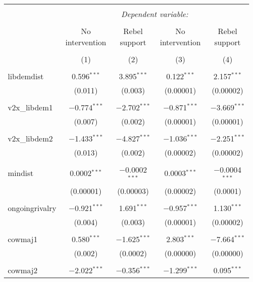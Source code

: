 
\begin{table}[!htbp] \centering 
  \caption{} 
  \label{} 
\begin{tabular}{@{\extracolsep{5pt}}lcccc} 
\\[-1.8ex]\hline 
\hline \\[-1.8ex] 
 & \multicolumn{4}{c}{\textit{Dependent variable:}} \\ 
\cline{2-5} 
\\[-1.8ex] & No intervention & Rebel support & No intervention & Rebel support \\ 
\\[-1.8ex] & (1) & (2) & (3) & (4)\\ 
\hline \\[-1.8ex] 
 libdemdist & 0.596$^{***}$ & 3.895$^{***}$ & 0.122$^{***}$ & 2.157$^{***}$ \\ 
  & (0.011) & (0.003) & (0.00001) & (0.00002) \\ 
  & & & & \\ 
 v2x\_libdem1 & $-$0.774$^{***}$ & $-$2.702$^{***}$ & $-$0.871$^{***}$ & $-$3.669$^{***}$ \\ 
  & (0.007) & (0.002) & (0.00001) & (0.00001) \\ 
  & & & & \\ 
 v2x\_libdem2 & $-$1.433$^{***}$ & $-$4.827$^{***}$ & $-$1.036$^{***}$ & $-$2.251$^{***}$ \\ 
  & (0.013) & (0.002) & (0.00002) & (0.00002) \\ 
  & & & & \\ 
 mindist & 0.0002$^{***}$ & $-$0.0002$^{***}$ & 0.0003$^{***}$ & $-$0.0004$^{***}$ \\ 
  & (0.00001) & (0.00003) & (0.00002) & (0.0001) \\ 
  & & & & \\ 
 ongoingrivalry & $-$0.921$^{***}$ & 1.691$^{***}$ & $-$0.957$^{***}$ & 1.130$^{***}$ \\ 
  & (0.004) & (0.003) & (0.00001) & (0.00002) \\ 
  & & & & \\ 
 cowmaj1 & 0.580$^{***}$ & $-$1.625$^{***}$ & 2.803$^{***}$ & $-$7.664$^{***}$ \\ 
  & (0.002) & (0.0002) & (0.00000) & (0.00000) \\ 
  & & & & \\ 
 cowmaj2 & $-$2.022$^{***}$ & $-$0.356$^{***}$ & $-$1.299$^{***}$ & 0.095$^{***}$ \\ 

\end{tabular}
\end{table}

